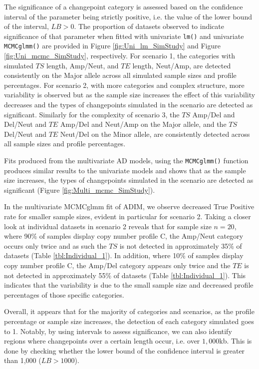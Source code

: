 The significance of a changepoint category is assessed based on the confidence interval of the parameter being strictly positive, i.e. the value of the lower bound of the interval, $LB > 0$. The proportion of datasets observed to indicate significance of that parameter when fitted with univariate \texttt{lm()} and univariate \texttt{MCMCglmm()} are provided in Figure \ref{fig:Uni_lm_SimStudy} and Figure \ref{fig:Uni_mcmc_SimStudy}, respectively. For scenario 1, the categories with simulated $TS$ length, Amp/Neut, and $TE$ length, Neut/Amp, are detected consistently on the Major allele across all simulated sample sizes and profile percentages. For scenario 2, with more categories and complex structure, more variability is observed but as the sample size increases the effect of this variability decreases and the types of changepoints simulated in the scenario are detected as significant. Similarly for the complexity of scenario 3, the $TS$ Amp/Del and Del/Neut and $TE$ Amp/Del and Neut/Amp on the Major allele, and the $TS$ Del/Neut and $TE$ Neut/Del on the Minor allele, are consistently detected across all sample sizes and profile percentages. 

Fits produced from the multivariate AD models, using the \texttt{MCMCglmm()} function produces similar results to the univariate models and shows that as the sample size increases, the types of changepoints simulated in the scenario are detected as significant (Figure \ref{fig:Multi_mcmc_SimStudy}).

In the multivariate MCMCglmm fit of ADIM, we observe decreased True Positive rate for smaller sample sizes, evident in particular for scenario 2. Taking a closer look at individual datasets in scenario 2 reveals that for sample size $n = 20$, where 90\% of samples display copy number profile C, the Amp/Neut category occurs only twice and as such the $TS$ is not detected in approximately 35\% of datasets (Table \ref{tbl:Individual_1}). In addition, where 10\% of samples display copy number profile C, the Amp/Del category appears only twice and the $TE$ is not detected in approximately 55\% of datasets (Table \ref{tbl:Individual_1}). This indicates that the variability is due to the small sample size and decreased profile percentages of those specific categories. 

Overall, it appears that for the majority of categories and scenarios, as the profile percentage or sample size increases, the detection of each category simulated goes to 1. Notably, by using intervals to assess significance, we can also identify regions where changepoints over a certain length occur, i.e. over $1,000$kb. This is done by checking whether the lower bound of the confidence interval is greater than 1,000 ($LB > 1000$).

